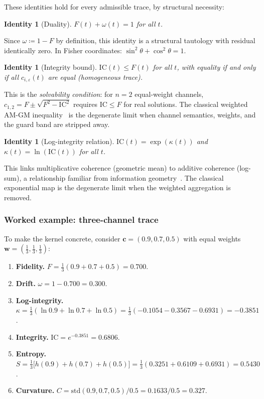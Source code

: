 \documentclass[
  aps,
  prd,
  twocolumn,
  superscriptaddress,
  nofootinbib,
  floatfix
]{revtex4-2}
\newtheorem{identity}[theorem]{Identity}
\newcommand{\eps}{\varepsilon}
\newcommand{\tvec}{\mathbf{c}}
\newcommand{\wvec}{\mathbf{w}}
\newcommand{\IC}{\mathrm{IC}}
\begin{document}
These identities hold for every admissible trace, by structural
necessity:

\begin{identity}[Duality]
\label{id:duality}
$F(t) + \omega(t) = 1$ for all $t$.
\end{identity}

\noindent Since $\omega \coloneqq 1 - F$ by definition, this
identity is a structural tautology with residual identically zero.
In Fisher coordinates: $\sin^2\theta + \cos^2\theta = 1$.

\begin{identity}[Integrity bound]
\label{id:bound}
$\IC(t) \leq F(t)$ for all $t$, with equality if and only if all
$c_{i,\eps}(t)$ are equal (homogeneous trace).
\end{identity}

\noindent This is the \emph{solvability condition}: for $n = 2$
equal-weight channels, $c_{1,2} = F \pm \sqrt{F^2 - \IC^2}$
requires $\IC \leq F$ for real solutions.  The classical weighted
AM-GM inequality~\cite{hardylittlewoodpolya1952} is the degenerate
limit when channel semantics, weights, and the guard band are
stripped away.

\begin{identity}[Log-integrity relation]
\label{id:logint}
$\IC(t) = \exp(\kappa(t))$ and $\kappa(t) = \ln(\IC(t))$ for
all $t$.
\end{identity}

\noindent This links multiplicative coherence (geometric mean) to
additive coherence (log-sum), a relationship familiar from
information geometry~\cite{amari2016information}.  The classical
exponential map is the degenerate limit when the weighted
aggregation is removed.

\subsubsection{Worked example: three-channel trace}

To make the kernel concrete, consider
$\tvec = (0.9, 0.7, 0.5)$ with equal weights
$\wvec = (\tfrac{1}{3}, \tfrac{1}{3}, \tfrac{1}{3})$:

\begin{enumerate}[leftmargin=*,label=\textbf{\arabic*.}]
\item \textbf{Fidelity.}
  $F = \tfrac{1}{3}(0.9 + 0.7 + 0.5) = 0.700$.
\item \textbf{Drift.}
  $\omega = 1 - 0.700 = 0.300$.
\item \textbf{Log-integrity.}
  $\kappa = \tfrac{1}{3}(\ln 0.9 + \ln 0.7 + \ln 0.5)
  = \tfrac{1}{3}(-0.1054 - 0.3567 - 0.6931)
  = -0.3851$.
\item \textbf{Integrity.}
  $\IC = e^{-0.3851} = 0.6806$.
\item \textbf{Entropy.}
  $S = \tfrac{1}{3}\bigl[h(0.9) + h(0.7) + h(0.5)\bigr]
  = \tfrac{1}{3}(0.3251 + 0.6109 + 0.6931) = 0.5430$.
\item \textbf{Curvature.}
  $C = \mathrm{std}(0.9\!, 0.7\!, 0.5)/0.5 =
  0.1633/0.5 = 0.327$.
\end{enumerate}
\end{document}
